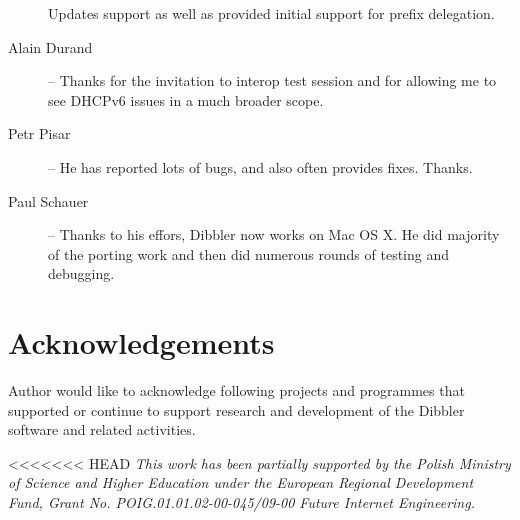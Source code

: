 \begin{description}
  Updates support as well as provided initial support for prefix
  delegation.
\item[Alain Durand] -- Thanks for the invitation to interop test
  session and for allowing me to see DHCPv6 issues in a much broader
  scope.
\item[Petr Pisar] -- He has reported lots of bugs, and also often
  provides fixes.  Thanks.
\item[Paul Schauer] -- Thanks to his effors, Dibbler now works on Mac
  OS X. He did majority of the porting work and then did numerous
  rounds of testing and debugging.
\end{description}

\newpage
\section{Acknowledgements}
Author would like to acknowledge following projects and programmes
that supported or continue to support research and development of
the Dibbler software and related activities.

<<<<<<< HEAD
\emph{This work has been partially supported by the Polish Ministry of
Science and Higher Education under the European Regional Development
Fund, Grant No. POIG.01.01.02-00-045/09-00 Future Internet Engineering.}

